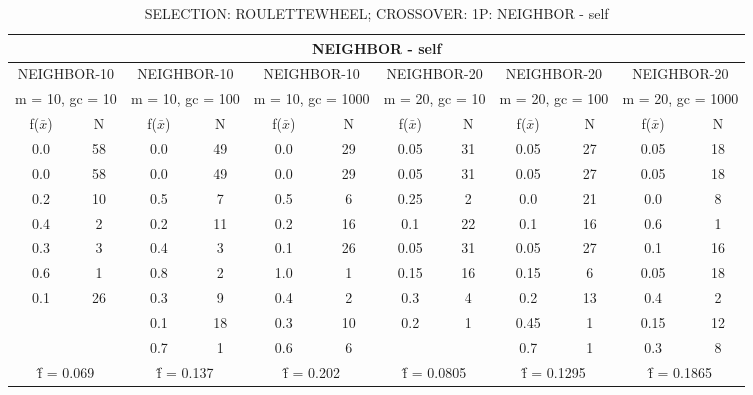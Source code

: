 \begin{table}[H]
	\centering
	\caption{SELECTION: ROULETTEWHEEL; CROSSOVER: 1P: NEIGHBOR - self}
	\begin{adjustbox}{width=1\textwidth}
		\begin{tabular}{ |c|c||c|c||c|c||c|c||c|c||c|c| }
			\hline
			\multicolumn{12}{|c|}{NEIGHBOR - self} \\
			\hline
			\multicolumn{2}{|c||}{NEIGHBOR-10} & \multicolumn{2}{c||}{NEIGHBOR-10} & \multicolumn{2}{c||}{NEIGHBOR-10} & \multicolumn{2}{c||}{NEIGHBOR-20} & \multicolumn{2}{c||}{NEIGHBOR-20} & \multicolumn{2}{c|}{NEIGHBOR-20}\\
			\hline
			\multicolumn{2}{|c||}{m = 10, gc = 10} & \multicolumn{2}{c||}{m = 10, gc = 100} & \multicolumn{2}{c||}{m = 10, gc = 1000} & \multicolumn{2}{c||}{m = 20, gc = 10} & \multicolumn{2}{c||}{m = 20, gc = 100} & \multicolumn{2}{c|}{m = 20, gc = 1000}\\
			\hline
			f($\bar{x}$) & N & f($\bar{x}$) & N & f($\bar{x}$) & N & f($\bar{x}$) & N & f($\bar{x}$) & N & f($\bar{x}$) & N\\
			\hline
			\hline
			0.0 & 58 & 0.0 & 49 & 0.0 & 29 & 0.05 & 31 & 0.05 & 27 & 0.05 & 18\\
			\hline
			0.0 & 58 & 0.0 & 49 & 0.0 & 29 & 0.05 & 31 & 0.05 & 27 & 0.05 & 18\\
			0.2 & 10 & 0.5 & 7 & 0.5 & 6 & 0.25 & 2 & 0.0 & 21 & 0.0 & 8\\
			0.4 & 2 & 0.2 & 11 & 0.2 & 16 & 0.1 & 22 & 0.1 & 16 & 0.6 & 1\\
			0.3 & 3 & 0.4 & 3 & 0.1 & 26 & 0.05 & 31 & 0.05 & 27 & 0.1 & 16\\
			0.6 & 1 & 0.8 & 2 & 1.0 & 1 & 0.15 & 16 & 0.15 & 6 & 0.05 & 18\\
			0.1 & 26 & 0.3 & 9 & 0.4 & 2 & 0.3 & 4 & 0.2 & 13 & 0.4 & 2\\
			&   & 0.1 & 18 & 0.3 & 10 & 0.2 & 1 & 0.45 & 1 & 0.15 & 12\\
			&   & 0.7 & 1 & 0.6 & 6 &   &   & 0.7 & 1 & 0.3 & 8\\
			\hline
			\multicolumn{2}{|c||}{\^{f} = 0.069} & \multicolumn{2}{c||}{\^{f} = 0.137} & \multicolumn{2}{c||}{\^{f} = 0.202} & \multicolumn{2}{c||}{\^{f} = 0.0805} & \multicolumn{2}{c||}{\^{f} = 0.1295} & \multicolumn{2}{c|}{\^{f} = 0.1865}\\
			\hline
		\end{tabular}
	\end{adjustbox}
\end{table}
